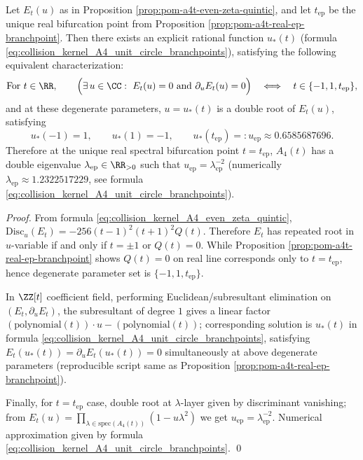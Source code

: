 \begin{proposition}\label{prop:pom-a4t-even-spectrum-double-root-ustar}
Let \(E_t(u)\) as in Proposition \ref{prop:pom-a4t-even-zeta-quintic}, and let \(t_{\mathrm{ep}}\) be the unique real bifurcation point from Proposition \ref{prop:pom-a4t-real-ep-branchpoint}.
Then there exists an explicit rational function \(u_\ast(t)\) (formula \eqref{eq:collision_kernel_A4_unit_circle_branchpoints}), satisfying the following equivalent characterization:
\[
\text{For }t\in\RR,\qquad
\Bigl(\exists\,u\in\CC:\ E_t(u)=0\ \text{and}\ \partial_uE_t(u)=0\Bigr)
\quad\Longleftrightarrow\quad
t\in\{-1,1,t_{\mathrm{ep}}\},
\]
and at these degenerate parameters, \(u=u_\ast(t)\) is a double root of \(E_t(u)\), satisfying
\[
u_\ast(-1)=1,\qquad u_\ast(1)=-1,\qquad u_\ast(t_{\mathrm{ep}})=:u_{\mathrm{ep}}\approx 0.6585687696.
\]
Therefore at the unique real spectral bifurcation point \(t=t_{\mathrm{ep}}\), \(A_4(t)\) has a double eigenvalue \(\lambda_{\mathrm{ep}}\in\RR_{>0}\) such that
\(
u_{\mathrm{ep}}=\lambda_{\mathrm{ep}}^{-2}
\)
(numerically \(\lambda_{\mathrm{ep}}\approx 1.2322517229\), see formula \eqref{eq:collision_kernel_A4_unit_circle_branchpoints}).
\end{proposition}
\begin{proof}
From formula \eqref{eq:collision_kernel_A4_even_zeta_quintic},
\(\mathrm{Disc}_u(E_t)=-256(t-1)^2(t+1)^2Q(t)\).
Therefore \(E_t\) has repeated root in \(u\)-variable if and only if \(t=\pm1\) or \(Q(t)=0\).
While Proposition \ref{prop:pom-a4t-real-ep-branchpoint} shows \(Q(t)=0\) on real line corresponds only to \(t=t_{\mathrm{ep}}\), hence degenerate parameter set is \(\{-1,1,t_{\mathrm{ep}}\}\).
\par
In \(\ZZ[t]\) coefficient field, performing Euclidean/subresultant elimination on \((E_t,\partial_uE_t)\), the subresultant of degree \(1\) gives a linear factor
\(
(\text{polynomial}(t))\cdot u-(\text{polynomial}(t))
\);
corresponding solution is \(u_\ast(t)\) in formula \eqref{eq:collision_kernel_A4_unit_circle_branchpoints}, satisfying
\(
E_t(u_\ast(t))=\partial_uE_t(u_\ast(t))=0
\)
simultaneously at above degenerate parameters (reproducible script same as Proposition \ref{prop:pom-a4t-real-ep-branchpoint}).
\par
Finally, for \(t=t_{\mathrm{ep}}\) case, double root at \(\lambda\)-layer given by discriminant vanishing;
from \(E_t(u)=\prod_{\lambda\in\mathrm{spec}(A_4(t))}(1-u\lambda^2)\) we get \(u_{\mathrm{ep}}=\lambda_{\mathrm{ep}}^{-2}\).
Numerical approximation given by formula \eqref{eq:collision_kernel_A4_unit_circle_branchpoints}. \qed
\end{proof}

